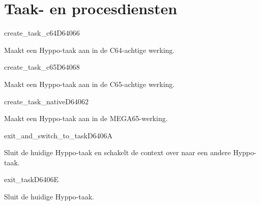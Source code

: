 \newpage
\section{Taak- en procesdiensten}


\begin{hyppotrap}{create\_task\_c64}{D640}{66}
\item [Dienst:]  Maakt een Hyppo-taak aan in de C64-achtige werking.
\notimplemented
\end{hyppotrap}


\begin{hyppotrap}{create\_task\_c65}{D640}{68}
\item [Dienst:]  Maakt een Hyppo-taak aan in de C65-achtige werking.
\notimplemented
\end{hyppotrap}


\begin{hyppotrap}{create\_task\_native}{D640}{62}
\item [Dienst:]  Maakt een Hyppo-taak aan in de MEGA65-werking.
\notimplemented
\end{hyppotrap}


\begin{hyppotrap}{exit\_and\_switch\_to\_task}{D640}{6A}
\item [Dienst:]  Sluit de huidige Hyppo-taak en schakelt de context over naar een andere Hyppo-taak.
\notimplemented
\end{hyppotrap}


\begin{hyppotrap}{exit\_task}{D640}{6E}
\item [Dienst:]  Sluit de huidige Hyppo-taak. %
\notimplemented
\end{hyppotrap}


